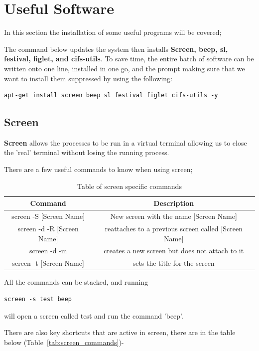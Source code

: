 \section{Useful Software}

In this section the installation of some useful programs will be covered;

The command below updates the system then installs \textbf{Screen, beep, sl, festival, figlet, and cifs-utils}.  To save time, the entire batch of software can be written onto one line, installed in one go, and the prompt making sure that we want to install them suppressed by using the following:

\begin{lstlisting}
apt-get install screen beep sl festival figlet cifs-utils -y
\end{lstlisting}

\subsection{Screen}

\textbf{Screen} allows the processes to be run in a virtual terminal allowing us to close the 'real' terminal without losing the running process.

There are a few useful commands to know when using screen;

\begin{table}[!th]
\centering
\begin{tabular}{cc}
\hline
Command & Description\\
\hline
screen -S [Screen Name] & New screen with the name [Screen Name]\\
screen -d -R [Screen Name] & reattaches to a previous screen called [Screen Name]\\
screen -d -m & creates a new screen but does not attach to it\\
screen -t [Screen Name] & sets the title for the screen\\
\hline
\end{tabular}
\caption{Table of screen specific commands}
\label{tab:screen_commands2}
\end{table}

All the commands can be stacked, and running 
\begin{lstlisting}
screen -s test beep
\end{lstlisting}

will open a screen called test and run the command 'beep'.

There are also key shortcuts that are active in screen, there are in the table below (Table~\ref{tab:screen_commands})-

